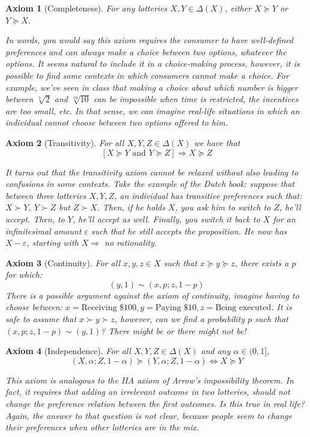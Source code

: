 \documentclass[12pt]{report}
\newtheorem{axiom}{Axiom}[chapter]
\begin{document}
\begin{axiom}[Completeness] For any lotteries $X,Y\in\Delta (X)$, either $X\succeq Y$ or $Y \succeq X$.

In words, you would say this axiom requires the consumer to have well-defined preferences and can always make a choice between two options, whatever the options. It seems natural to include it in a choice-making process, however, it is possible to find some contexts in which consumers cannot make a choice. For example, we've seen in class that making a choice about which number is bigger between $\sqrt[3]{2}$ and $\sqrt[10]{10}$ can be impossible when time is restricted, the incentives are too small, etc. In that sense, we can imagine real-life situations in which an individual cannot choose between two options offered to him.
\end{axiom}

\begin{axiom}[Transitivity] For all $X,Y,Z\in\Delta (X)$ we have that $$ [X\succeq Y \text{ and } Y\succeq Z] \Rightarrow X\succeq Z $$

It turns out that the transitivity axiom cannot be relaxed without also leading to confusions in some contexts. Take the example of the Dutch book: suppose that between three lotteries $X,Y,Z$, an individual has transitive preferences such that: $X\succ Y$, $Y\succ Z$ but $Z\succ X$. Then, if he holds $X$, you ask him to switch to $Z$, he'll accept. Then, to $Y$, he'll accept as well. Finally, you switch it back to $X$ for an infinitesimal amount $\varepsilon$ such that he still accepts the proposition. He now has $X-\varepsilon$, starting with $X \Rightarrow $ no rationality.
\end{axiom}

\begin{axiom}[Continuity] For all $x,y,z\in X$ such that $x\succeq y\succeq z$, there exists a $p$ for which:$$(y,1)\sim (x,p;z,1-p)$$ There is a possible argument against the axiom of continuity, imagine having to choose between: ${x = \text{Receiving \$ 100},y = \text{Paying \$ 10},z = \text{Being executed}}$. It is safe to assume that $x\succ y \succ z$, however, can we find a probability $p$ such that $(x,p; z,1-p)\sim (y,1)$? There might be or there might not be!
\end{axiom}

\begin{axiom}[Independence] For all $X,Y,Z\in\Delta (X)$ and any $\alpha\in (0,1]$, $$ (X,\alpha;Z, 1-\alpha) \succeq (Y,\alpha; Z,1-\alpha) \Leftrightarrow X\succeq Y $$

This axiom is analogous to the IIA axiom of Arrow's impossibility theorem. In fact, it requires that adding an irrelevant outcome in two lotteries, should not change the preference relation between the first outcomes. Is this true in real life? Again, the answer to that question is not clear, because people seem to change their preferences when other lotteries are in the mix.
\end{axiom}
\end{document}
